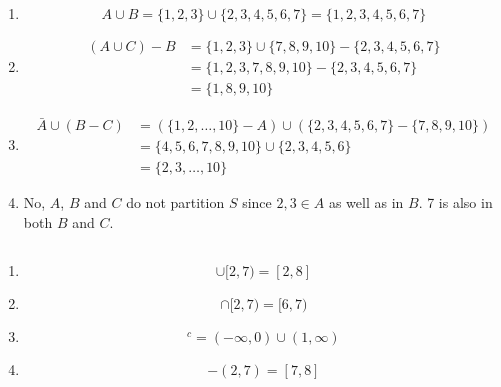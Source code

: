 
 
\begin{problem}{1} $ $
	\begin{enumerate}
		
		\item 
			\begin{equation} 
				A \cup B = \{1, 2, 3\} \cup \{2, 3, 4, 5, 6, 7 \} =  \{1, 2, 3, 4, 5, 6, 7 \}  \nonumber
			\end{equation}
		
		\item 
			\begin{align}
				(A \cup C) - B &= \{1, 2, 3\} \cup \{ 7, 8, 9, 10\} -  \{2, 3, 4, 5, 6, 7 \} \nonumber \\
				&=  \{1, 2, 3, 7, 8, 9, 10\} -  \{2, 3, 4, 5, 6, 7 \} \nonumber \\
				& = \{ 1, 8, 9, 10\} \nonumber
			\end{align}
			
		\item 
			\begin{align}
				\bar A \cup (B-C) & = (\{1, 2, \ldots, 10 \}-A) \cup \left (\{2, 3, 4, 5, 6, 7 \} - \{7, 8, 9, 10 \} \right) \nonumber \\
				&= \{4, 5, 6, 7, 8, 9, 10\} \cup \{ 2, 3, 4, 5, 6 \} \nonumber \\
				& = \{2, 3, \ldots, 10 \} \nonumber
			\end{align}
			
		\item No, $A$, $B$ and $C$ do not partition $S$ since $2, 3 \in A$ as well as in $B$.  7 is also in both $B$ and $C$.		

	\end{enumerate}
\end{problem}



\begin{problem}{2} $ $
	\begin{enumerate}
		
		\item 
			\begin{equation} 
				[6, 8]\cup [2, 7)= [2, 8] \nonumber
			\end{equation}
		
		\item 
			\begin{equation} 
				[6, 8]\cap [2, 7)= [6, 7) \nonumber
			\end{equation}
			
		\item 
			\begin{equation} 
				[0, 1]^c = (-\infty, 0) \cup (1, \infty) \nonumber
			\end{equation}
		\item
			\begin{equation} 
				[6, 8] - (2, 7) = [7, 8] \nonumber
			\end{equation} 

	\end{enumerate}
\end{problem}


